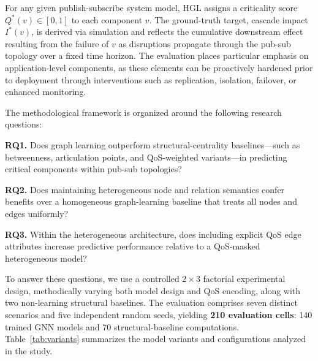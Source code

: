\documentclass[sigconf,9pt,anonymous]{acmart}
\begin{document}
For any given publish-subscribe system model, HGL assigns a criticality score $Q^*(v) \in [0,1]$ to each component $v$. The ground-truth target, cascade impact $I^*(v)$, is derived via simulation and reflects the cumulative downstream effect resulting from the failure of $v$ as disruptions propagate through the pub-sub topology over a fixed time horizon. The evaluation places particular emphasis on application-level components, as these elements can be proactively hardened prior to deployment through interventions such as replication, isolation, failover, or enhanced monitoring.

The methodological framework is organized around the following research questions:

\textbf{RQ1.} Does graph learning outperform structural-centrality baselines—such as betweenness, articulation points, and QoS-weighted variants—in predicting critical components within pub-sub topologies?

\textbf{RQ2.} Does maintaining heterogeneous node and relation semantics confer benefits over a homogeneous graph-learning baseline that treats all nodes and edges uniformly?

\textbf{RQ3.} Within the heterogeneous architecture, does including explicit QoS edge attributes increase predictive performance relative to a QoS-masked heterogeneous model?

To answer these questions, we use a controlled $2\times3$ factorial experimental design, methodically varying both model design and QoS encoding, along with two non-learning structural baselines. The evaluation comprises seven distinct scenarios and five independent random seeds, yielding \textbf{210 evaluation cells}: 140 trained GNN models and 70 structural-baseline computations. Table~\ref{tab:variants} summarizes the model variants and configurations analyzed in the study.
\end{document}
